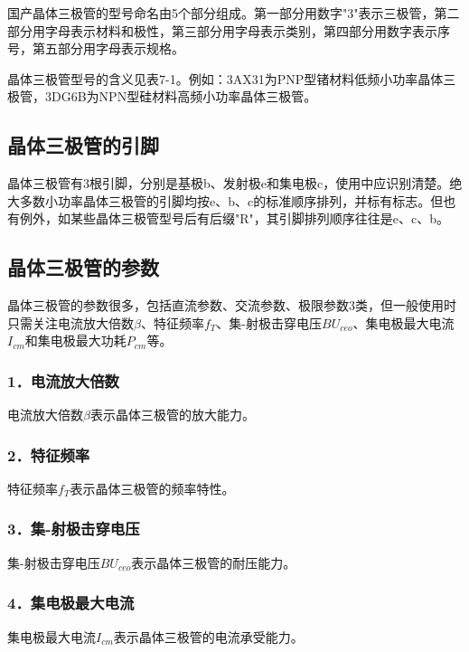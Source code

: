 \documentclass[12pt,UTF8]{ctexbook}
\begin{document}
国产晶体三极管的型号命名由5个部分组成。第一部分用数字"3"表示三极管，第二部分用字母表示材料和极性，第三部分用字母表示类别，第四部分用数字表示序号，第五部分用字母表示规格。

晶体三极管型号的含义见表7-1。例如：3AX31为PNP型锗材料低频小功率晶体三极管，3DG6B为NPN型硅材料高频小功率晶体三极管。

\subsection{晶体三极管的引脚}

晶体三极管有3根引脚，分别是基极b、发射极e和集电极c，使用中应识别清楚。绝大多数小功率晶体三极管的引脚均按e、b、c的标准顺序排列，并标有标志。但也有例外，如某些晶体三极管型号后有后缀"R"，其引脚排列顺序往往是e、c、b。

\subsection{晶体三极管的参数}

晶体三极管的参数很多，包括直流参数、交流参数、极限参数3类，但一般使用时只需关注电流放大倍数$\beta$、特征频率$f_T$、集-射极击穿电压$BU_{ceo}$、集电极最大电流$I_{cm}$和集电极最大功耗$P_{cm}$等。

\subsubsection{1．电流放大倍数}

电流放大倍数$\beta$表示晶体三极管的放大能力。

\subsubsection{2．特征频率}

特征频率$f_T$表示晶体三极管的频率特性。

\subsubsection{3．集-射极击穿电压}

集-射极击穿电压$BU_{ceo}$表示晶体三极管的耐压能力。

\subsubsection{4．集电极最大电流}

集电极最大电流$I_{cm}$表示晶体三极管的电流承受能力。
\end{document}
